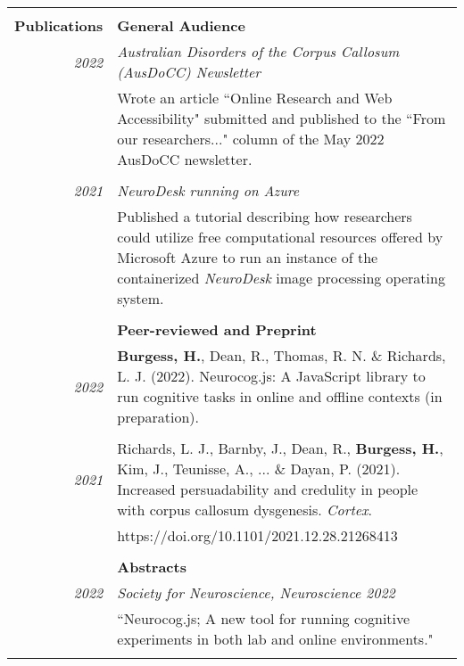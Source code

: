 \documentclass{article}
\begin{document}
\begin{longtable}{r | p{13cm}}
											\pagebreak

											\hline \\
		\large\textbf{Publications}			& \large\textbf{General Audience} \\
		\large\textit{2022}					& \large\textit{Australian Disorders of the Corpus Callosum (AusDoCC) Newsletter} \\
											& Wrote an article ``Online Research and Web Accessibility" submitted and published to the ``From our researchers..." column of the May 2022 AusDoCC newsletter. \\	
											& \\
											
		\large\textit{2021}					& \large\textit{NeuroDesk running on Azure}	\\	
											& Published a tutorial describing how researchers could utilize free computational resources offered by Microsoft Azure to run an instance of the containerized \textit{NeuroDesk} image processing operating system. \\
											& \\
											
											& \large\textbf{Peer-reviewed and Preprint} \\
		\large\textit{2022}					&  \textbf{Burgess, H.}, Dean, R., Thomas, R. N. \& Richards, L. J. (2022). Neurocog.js: A JavaScript library to run cognitive tasks in online and offline contexts (in preparation). \\
											& \\

		\large\textit{2021}					& Richards, L. J., Barnby, J., Dean, R., \textbf{Burgess, H.}, Kim, J., Teunisse, A., ... \& Dayan, P. (2021). Increased persuadability and credulity in people with corpus callosum dysgenesis. \textit{Cortex}. \\
											& https://doi.org/10.1101/2021.12.28.21268413 \\
											& \\
											
											& \large\textbf{Abstracts} \\
		\large\textit{2022}					& \large\textit{Society for Neuroscience, Neuroscience 2022}\\
											& ``Neurocog.js; A new tool for running cognitive experiments in both lab and online environments."  \\
											& \\


\end{longtable}
\end{document}
